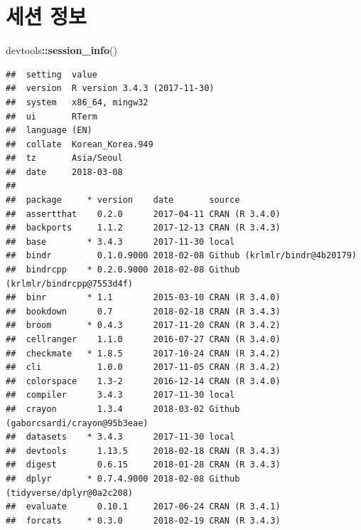\documentclass[12pt,]{krantz}
\newenvironment{Shaded}{\begin{snugshade}}{\end{snugshade}}
\newcommand{\KeywordTok}[1]{\textcolor[rgb]{0.13,0.29,0.53}{\textbf{#1}}}
\newcommand{\OperatorTok}[1]{\textcolor[rgb]{0.81,0.36,0.00}{\textbf{#1}}}
\newcommand{\NormalTok}[1]{#1}
\theoremstyle{definition}
\theoremstyle{definition}
\theoremstyle{definition}
\theoremstyle{remark}
\begin{document}
\chapter{세션 정보}\label{session-info}

\begin{Shaded}
\begin{Highlighting}[]
\NormalTok{devtools}\OperatorTok{::}\KeywordTok{session_info}\NormalTok{()}
\end{Highlighting}
\end{Shaded}

\begin{verbatim}
##  setting  value                       
##  version  R version 3.4.3 (2017-11-30)
##  system   x86_64, mingw32             
##  ui       RTerm                       
##  language (EN)                        
##  collate  Korean_Korea.949            
##  tz       Asia/Seoul                  
##  date     2018-03-08                  
## 
##  package     * version    date       source                              
##  assertthat    0.2.0      2017-04-11 CRAN (R 3.4.0)                      
##  backports     1.1.2      2017-12-13 CRAN (R 3.4.3)                      
##  base        * 3.4.3      2017-11-30 local                               
##  bindr         0.1.0.9000 2018-02-08 Github (krlmlr/bindr@4b20179)       
##  bindrcpp    * 0.2.0.9000 2018-02-08 Github (krlmlr/bindrcpp@7553d4f)    
##  binr        * 1.1        2015-03-10 CRAN (R 3.4.0)                      
##  bookdown      0.7        2018-02-18 CRAN (R 3.4.3)                      
##  broom       * 0.4.3      2017-11-20 CRAN (R 3.4.2)                      
##  cellranger    1.1.0      2016-07-27 CRAN (R 3.4.0)                      
##  checkmate   * 1.8.5      2017-10-24 CRAN (R 3.4.2)                      
##  cli           1.0.0      2017-11-05 CRAN (R 3.4.2)                      
##  colorspace    1.3-2      2016-12-14 CRAN (R 3.4.0)                      
##  compiler      3.4.3      2017-11-30 local                               
##  crayon        1.3.4      2018-03-02 Github (gaborcsardi/crayon@95b3eae) 
##  datasets    * 3.4.3      2017-11-30 local                               
##  devtools      1.13.5     2018-02-18 CRAN (R 3.4.3)                      
##  digest        0.6.15     2018-01-28 CRAN (R 3.4.3)                      
##  dplyr       * 0.7.4.9000 2018-02-08 Github (tidyverse/dplyr@0a2c208)    
##  evaluate      0.10.1     2017-06-24 CRAN (R 3.4.1)                      
##  forcats     * 0.3.0      2018-02-19 CRAN (R 3.4.3)                      

\end{verbatim}
\end{document}

